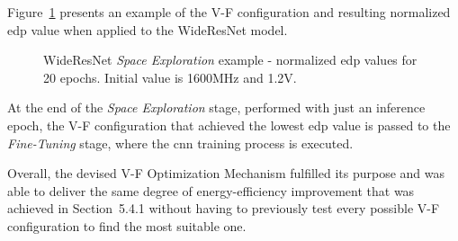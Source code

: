 Figure~\ref{fig:3d} presents an example of the V-F configuration and resulting normalized \acrshort{edp} value when applied to the WideResNet model.

\begin{figure}[h]
\centering
    \caption{WideResNet \textit{Space Exploration} example - normalized \acrshort{edp} values for 20 epochs. Initial value is 1600MHz and 1.2V.}
    \label{fig:3d}
\end{figure}


At the end of the \textit{Space Exploration} stage, performed with just an inference epoch, the V-F configuration that achieved the lowest \acrshort{edp} value is passed to the \textit{Fine-Tuning} stage, where the \acrshort{cnn}  training process is executed.

Overall, the devised V-F Optimization Mechanism fulfilled its purpose and was able to deliver the same degree of energy-efficiency improvement that was achieved in Section~5.4.1 without having to previously test every possible V-F configuration to find the most suitable one. 


